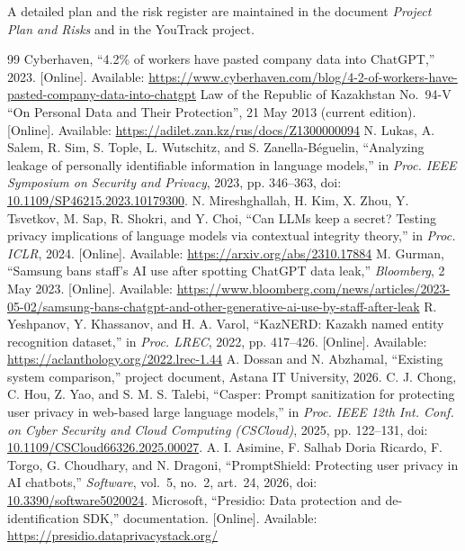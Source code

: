 \documentclass[12pt,a4paper]{article}
\newcommand{\doi}[1]{doi: \href{https://doi.org/#1}{#1}}
\begin{document}
A detailed plan and the risk register are maintained in the document \emph{Project Plan and Risks} and in the YouTrack project.

\begin{thebibliography}{99}
 Cyberhaven, ``4.2\% of workers have pasted company data into ChatGPT,'' 2023. [Online]. Available: \url{https://www.cyberhaven.com/blog/4-2-of-workers-have-pasted-company-data-into-chatgpt}
 Law of the Republic of Kazakhstan No.~94-V ``On Personal Data and Their Protection'', 21 May 2013 (current edition). [Online]. Available: \url{https://adilet.zan.kz/rus/docs/Z1300000094}
 N. Lukas, A. Salem, R. Sim, S. Tople, L. Wutschitz, and S. Zanella-Béguelin, ``Analyzing leakage of personally identifiable information in language models,'' in \emph{Proc. IEEE Symposium on Security and Privacy}, 2023, pp. 346--363, \doi{10.1109/SP46215.2023.10179300}.
 N. Mireshghallah, H. Kim, X. Zhou, Y. Tsvetkov, M. Sap, R. Shokri, and Y. Choi, ``Can LLMs keep a secret? Testing privacy implications of language models via contextual integrity theory,'' in \emph{Proc. ICLR}, 2024. [Online]. Available: \url{https://arxiv.org/abs/2310.17884}
 M. Gurman, ``Samsung bans staff's AI use after spotting ChatGPT data leak,'' \emph{Bloomberg}, 2 May 2023. [Online]. Available: \url{https://www.bloomberg.com/news/articles/2023-05-02/samsung-bans-chatgpt-and-other-generative-ai-use-by-staff-after-leak}
 R. Yeshpanov, Y. Khassanov, and H. A. Varol, ``KazNERD: Kazakh named entity recognition dataset,'' in \emph{Proc. LREC}, 2022, pp. 417--426. [Online]. Available: \url{https://aclanthology.org/2022.lrec-1.44}
 A. Dossan and N. Abzhamal, ``Existing system comparison,'' project document, Astana IT University, 2026.
 C. J. Chong, C. Hou, Z. Yao, and S. M. S. Talebi, ``Casper: Prompt sanitization for protecting user privacy in web-based large language models,'' in \emph{Proc. IEEE 12th Int. Conf. on Cyber Security and Cloud Computing (CSCloud)}, 2025, pp. 122--131, \doi{10.1109/CSCloud66326.2025.00027}.
 A. I. Asimine, F. Salhab Doria Ricardo, F. Torgo, G. Choudhary, and N. Dragoni, ``PromptShield: Protecting user privacy in AI chatbots,'' \emph{Software}, vol.~5, no.~2, art.~24, 2026, \doi{10.3390/software5020024}.
 Microsoft, ``Presidio: Data protection and de-identification SDK,'' documentation. [Online]. Available: \url{https://presidio.dataprivacystack.org/}
\end{thebibliography}
\end{document}
